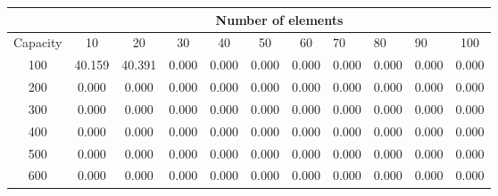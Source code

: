 \documentclass[11pt]{article}
\begin{document}
\begin{table}[h!]
\centering
\begin{tabular}{c|cccccccccc|}
\cline{2-11}
& \multicolumn{10}{c|}{Number of elements}\\ \hline
\multicolumn{1}{|c|}{Capacity} & \multicolumn{1}{c|}{10} & \multicolumn{1}{c|}{20} & \multicolumn{1}{c|}{30} & \multicolumn{1}{c|}{40} & \multicolumn{1}{c|}{50} & \multicolumn{1}{c|}{60} & \multicolumn{1}{l|}{70} & \multicolumn{1}{l|}{80} & \multicolumn{1}{l|}{90} & 100 \\ \hline
\multicolumn{1}{|c|}{100} & \multicolumn{1}{c|}{40.159} & \multicolumn{1}{c|}{40.391} & \multicolumn{1}{c|}{0.000} & \multicolumn{1}{c|}{0.000} & \multicolumn{1}{c|}{0.000} & \multicolumn{1}{c|}{0.000} & \multicolumn{1}{c|}{0.000} & \multicolumn{1}{c|}{0.000} & \multicolumn{1}{c|}{0.000}  & 0.000 \\ \hline
\multicolumn{1}{|c|}{200} & \multicolumn{1}{c|}{0.000} & \multicolumn{1}{c|}{0.000} & \multicolumn{1}{c|}{0.000} & \multicolumn{1}{c|}{0.000} & \multicolumn{1}{c|}{0.000} & \multicolumn{1}{c|}{0.000} & \multicolumn{1}{c|}{0.000} & \multicolumn{1}{c|}{0.000} & \multicolumn{1}{c|}{0.000}  & 0.000 \\ \hline
\multicolumn{1}{|c|}{300} & \multicolumn{1}{c|}{0.000} & \multicolumn{1}{c|}{0.000} & \multicolumn{1}{c|}{0.000} & \multicolumn{1}{c|}{0.000} & \multicolumn{1}{c|}{0.000} & \multicolumn{1}{c|}{0.000} & \multicolumn{1}{c|}{0.000} & \multicolumn{1}{c|}{0.000} & \multicolumn{1}{c|}{0.000}  & 0.000 \\ \hline
\multicolumn{1}{|c|}{400} & \multicolumn{1}{c|}{0.000} & \multicolumn{1}{c|}{0.000} & \multicolumn{1}{c|}{0.000} & \multicolumn{1}{c|}{0.000} & \multicolumn{1}{c|}{0.000} & \multicolumn{1}{c|}{0.000} & \multicolumn{1}{c|}{0.000} & \multicolumn{1}{c|}{0.000} & \multicolumn{1}{c|}{0.000}  & 0.000 \\ \hline
\multicolumn{1}{|c|}{500} & \multicolumn{1}{c|}{0.000} & \multicolumn{1}{c|}{0.000} & \multicolumn{1}{c|}{0.000} & \multicolumn{1}{c|}{0.000} & \multicolumn{1}{c|}{0.000} & \multicolumn{1}{c|}{0.000} & \multicolumn{1}{c|}{0.000} & \multicolumn{1}{c|}{0.000} & \multicolumn{1}{c|}{0.000}  & 0.000 \\ \hline
\multicolumn{1}{|c|}{600} & \multicolumn{1}{c|}{0.000} & \multicolumn{1}{c|}{0.000} & \multicolumn{1}{c|}{0.000} & \multicolumn{1}{c|}{0.000} & \multicolumn{1}{c|}{0.000} & \multicolumn{1}{c|}{0.000} & \multicolumn{1}{c|}{0.000} & \multicolumn{1}{c|}{0.000} & \multicolumn{1}{c|}{0.000}  & 0.000 \\ \hline

\end{tabular}
\end{table}
\end{document}
